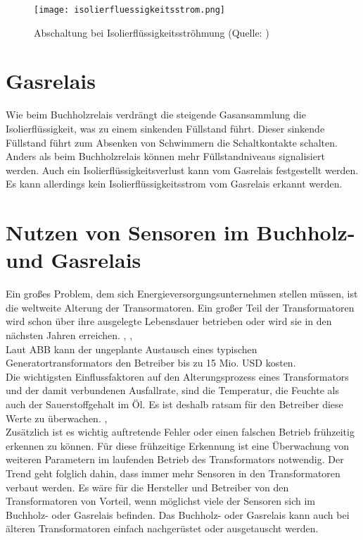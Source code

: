 \begin{figure}[h]
\centering
\texttt{[image: isolierfluessigkeitsstrom.png]}
\caption{Abschaltung bei Isolierflüssigkeitsströhmung (Quelle: \cite[][Fig. 7]{embKatalog})}
\end{figure}

\section{Gasrelais}
Wie beim Buchholzrelais verdrängt die steigende Gasansammlung die Isolierflüssigkeit, was zu einem sinkenden Füllstand führt. Dieser sinkende Füllstand führt zum Absenken von Schwimmern die Schaltkontakte schalten. Anders als beim Buchholzrelais können mehr Füllstandniveaus signalisiert werden. Auch ein Isolierflüssigkeitsverlust kann vom Gasrelais festgestellt werden. Es kann allerdings kein Isolierflüssigkeitsstrom vom Gasrelais erkannt werden.
\cite[][S. 32]{ieeeGuide}

\section{Nutzen von Sensoren im Buchholz- und Gasrelais}
Ein großes Problem, dem sich Energieversorgungsunternehmen stellen müssen, ist die weltweite Alterung der Transormatoren. Ein großer Teil der Transformatoren wird schon über ihre ausgelegte Lebensdauer betrieben oder wird sie in den nächsten Jahren erreichen.
\cite{tdworld_transformer_age},
\cite{Koch2008},
\cite{Islam2017}
\\
Laut ABB kann der ungeplante Austausch eines typischen Generatortransformators den Betreiber bis zu 15 Mio. USD kosten.
\cite{abbFit}
\\
Die wichtigsten Einflussfaktoren auf den Alterungsprozess eines Transformators und der damit verbundenen Ausfallrate, sind die Temperatur, die Feuchte als auch der Sauerstoffgehalt im Öl. Es ist deshalb ratsam für den Betreiber diese Werte zu überwachen.
\cite[][S. 12]{Koch2008},
\cite{Hofmann2004}
\\
Zusätzlich ist es wichtig auftretende Fehler oder einen falschen Betrieb frühzeitig erkennen zu können. Für diese frühzeitige Erkennung ist eine Überwachung von weiteren Parametern im laufenden Betrieb des Transformators notwendig. Der Trend geht folglich dahin, dass immer mehr Sensoren in den Transformatoren verbaut werden. Es wäre für die Hersteller und Betreiber von den Transformatoren von Vorteil, wenn  möglichst viele der Sensoren sich im Buchholz- oder Gasrelais befinden. Das Buchholz- oder Gasrelais kann auch bei älteren Transformatoren einfach nachgerüstet oder ausgetauscht werden.
\cite{Gockenbach2007}